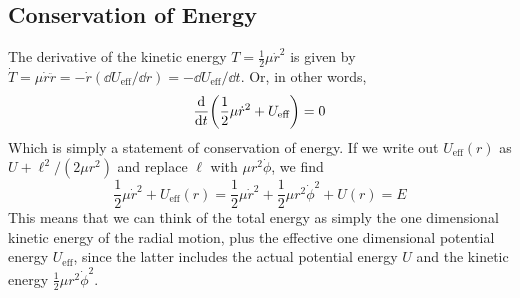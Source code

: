 \subsection*{Conservation of Energy}
The derivative of the kinetic energy $T = \frac{1}{2}\mu \dot r^2$ is given by $\dot T = \mu \dot r \ddot r = -\dot r (\dd U_\text{eff}/\dd r) = -\dd U_\text{eff}/\dd t$. Or, in other words,
\[ \frac{\dd}{\dd t} \pqty{\frac{1}{2}\mu \dot r^2 + U_\text{eff}} = 0\]
Which is simply a statement of conservation of energy. If we write out $U_\text{eff}(r)$ as $U + \ell^2/(2\mu r^2)$ and replace $\ell$ with $\mu r^2\dot\phi$, we find
\[ \frac{1}{2}\mu \dot r^2 + U_\text{eff}(r) = \frac{1}{2}\mu \dot r^2 + \frac{1}{2}\mu r^2\dot\phi^2 + U(r) = E\]
This means that we can think of the total energy as simply the one dimensional kinetic energy of the radial motion, plus the effective one dimensional potential energy $U_\text{eff}$, since the latter includes the actual potential energy $U$ and the kinetic energy $\frac{1}{2}\mu r^2\dot\phi^2$. 